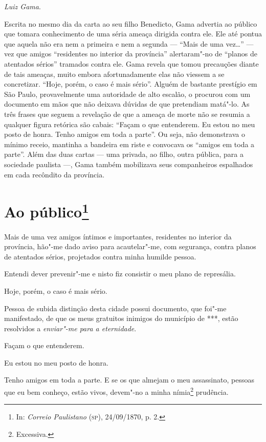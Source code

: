 \hfill\emph{Luiz Gama}.

\paginabranca
\mbox{}\vfill
\thispagestyle{empty}

{\small\noindent
Escrita no mesmo dia da carta ao seu filho Benedicto, Gama
advertia ao público que tomara conhecimento de uma séria ameaça dirigida
contra ele. Ele até pontua que aquela não era nem a primeira e nem a
segunda --- ``Mais de uma vez\ldots{}'' --- vez que amigos ``residentes no
interior da província'' alertaram"-no de ``planos de atentados sérios''
tramados contra ele. Gama revela que tomou precauções diante de tais
ameaças, muito embora afortunadamente elas não viessem a se concretizar.
``Hoje, porém, o caso é mais sério''. Alguém de bastante prestígio em São
Paulo, provavelmente uma autoridade de alto escalão, o procurou com um
documento em mãos que não deixava dúvidas de que pretendiam matá"-lo. As
três frases que seguem a revelação de que a ameaça de morte não se
resumia a qualquer figura retórica são cabais: ``Façam o que entenderem.
Eu estou no meu posto de honra. Tenho amigos em toda a parte''. Ou seja,
não demonstrava o mínimo receio, mantinha a bandeira em riste e
convocava os ``amigos em toda a parte''. Além das duas cartas --- uma
privada, ao filho, outra pública, para a sociedade paulista ---, Gama
também mobilizava seus companheiros espalhados em cada recôndito da
província.}

\chapter{Ao público\footnote[*]{In: \emph{Correio Paulistano} (\textsc{sp}),
  24/09/1870, p. 2.}}

Mais de uma vez amigos íntimos e importantes, residentes no interior da
província, hão"-me dado aviso para acautelar"-me, com segurança, contra
planos de atentados sérios, projetados contra minha humilde pessoa.

Entendi dever prevenir"-me e nisto fiz consistir o meu plano de
represália.

Hoje, porém, o caso é mais sério.

Pessoa de subida distinção desta cidade possui documento, que foi"-me
manifestado, de que os meus gratuitos inimigos do município de ***,
estão resolvidos a \emph{enviar"-me para a eternidade}.

Façam o que entenderem.

Eu estou no meu posto de honra.

Tenho amigos em toda a parte. E se os que almejam o meu assassinato,
pessoas que eu bem conheço, estão vivos, devem"-no a minha
nímia\footnote{Excessiva.} prudência.

